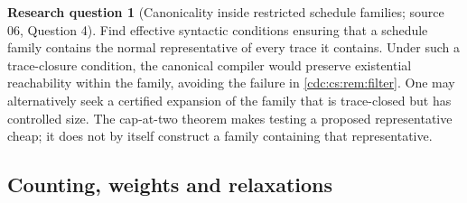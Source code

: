 \documentclass[11pt,a4paper]{article}
\theoremstyle{definition}
\newtheorem{question}[question]{Research question}
\theoremstyle{remark}
\begin{document}
\begin{question}[Canonicality inside restricted schedule families; source 06, Question 4]
Find effective syntactic conditions ensuring that a
schedule family contains the normal representative of every trace it
contains. Under such a trace-closure condition, the canonical compiler would
preserve existential reachability within the family, avoiding the failure in
\cref{cdc:cs:rem:filter}. One may alternatively seek a certified expansion of the
family that is trace-closed but has controlled size. The cap-at-two theorem
makes testing a proposed representative cheap; it does not by itself
construct a family containing that representative.
\end{question}

\subsection{Counting, weights and relaxations}
\end{document}

